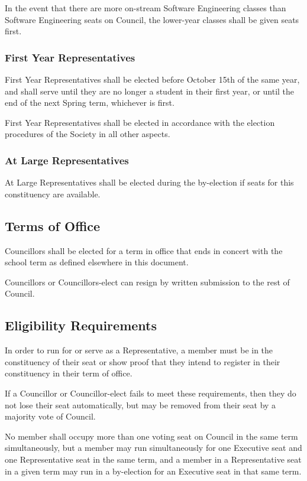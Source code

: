 In the event that there are more on-stream Software Engineering classes than
Software Engineering seats on Council, the lower-year classes shall be given
seats first.

\subsubsection{First Year Representatives}

First Year Representatives shall be elected before October 15th of the same
year, and shall serve until they are no longer a student in their first year,
or until the end of the next Spring term, whichever is first.

First Year Representatives shall be elected in accordance with the election
procedures of the Society in all other aspects.

\subsubsection{At Large Representatives}
At Large Representatives shall be elected during the by-election if seats for this constituency are available. 

\subsection{Terms of Office}
Councillors shall be elected for a term in office that ends in concert with the
school term as defined elsewhere in this document.

Councillors or Councillors-elect can resign by written submission to the rest
of Council.

\subsection{Eligibility Requirements}
In order to run for or serve as a Representative, a member must be in the
constituency of their seat or show proof that they intend to register in their
constituency in their term of office.

If a Councillor or Councillor-elect fails to meet these requirements, then they
do not lose their seat automatically, but may be removed from their seat by a
majority vote of Council.

No member shall occupy more than one voting seat on Council in the same term
simultaneously, but a member may run simultaneously for one Executive seat and
one Representative seat in the same term, and a member in a Representative seat
in a given term may run in a by-election for an Executive seat in that same
term.

